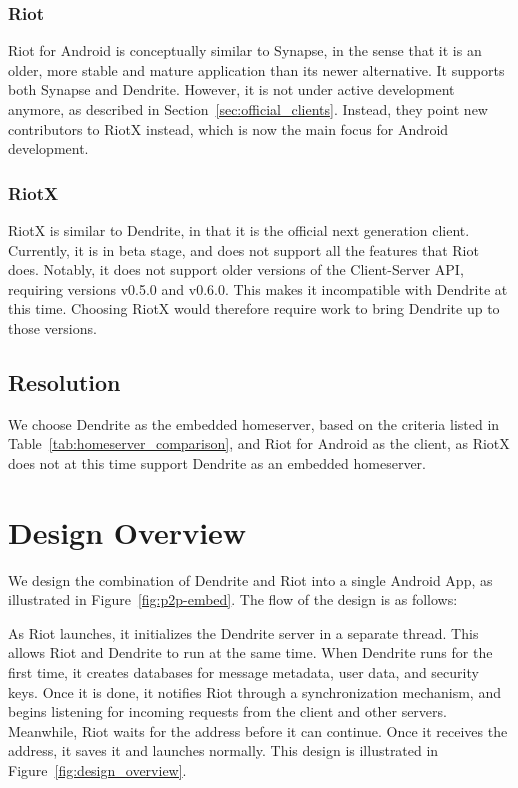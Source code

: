 \subsubsection{Riot}
Riot for Android is conceptually similar to Synapse, in the sense that it is an older, more stable and mature application than its newer alternative.
It supports both Synapse and Dendrite.
However, it is not under active development anymore, as described in Section~\ref{sec:official_clients}.
Instead, they point new contributors to RiotX instead, which is now the main focus for Android development.

\subsubsection{RiotX}
RiotX is similar to Dendrite, in that it is the official next generation client.
Currently, it is in beta stage, and does not support all the features that Riot does.
Notably, it does not support older versions of the Client-Server API, requiring versions v0.5.0 and v0.6.0.
This makes it incompatible with Dendrite at this time.
Choosing RiotX would therefore require work to bring Dendrite up to those versions.

\subsection{Resolution}
We choose Dendrite as the embedded homeserver, based on the criteria listed in Table~\ref{tab:homeserver_comparison}, and Riot for Android as the client, as RiotX does not at this time support Dendrite as an embedded homeserver.

\section{Design Overview}
We design the combination of Dendrite and Riot into a single Android App, as illustrated in Figure~\ref{fig:p2p-embed}.
The flow of the design is as follows:

As Riot launches, it initializes the Dendrite server in a separate thread.
This allows Riot and Dendrite to run at the same time.
When Dendrite runs for the first time, it creates databases for message metadata, user data, and security keys.
Once it is done, it notifies Riot through a synchronization mechanism, and begins listening for incoming requests from the client and other servers.
Meanwhile, Riot waits for the address before it can continue.
Once it receives the address, it saves it and launches normally.
This design is illustrated in Figure~\ref{fig:design_overview}.

